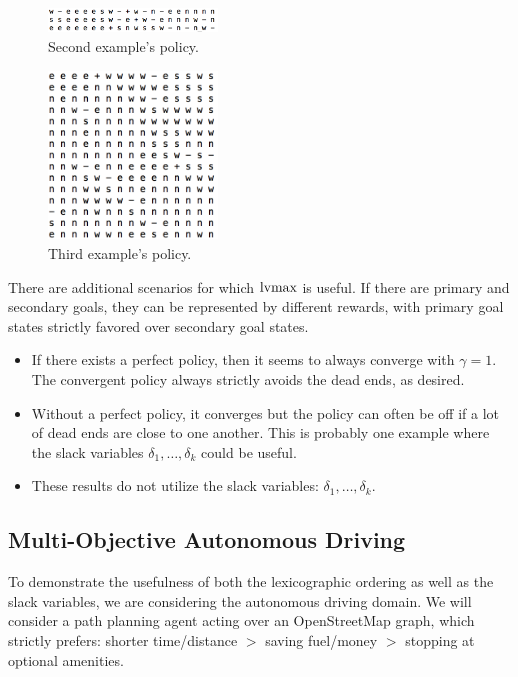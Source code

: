 \begin{figure}[h]
    \centering
    \includegraphics[width=0.4\textwidth,bb=0 0 561 81]{seed_2.png}
    \caption{Second example's policy.}
    \label{fig:seed_2}
\end{figure}

\begin{figure}[h]
    \centering
    \includegraphics[width=0.4\textwidth,bb=0 0 418 416]{seed_3.png}
    \caption{Third example's policy.}
    \label{fig:seed_3}
\end{figure}

There are additional scenarios for which $\operatorname*{lvmax}$ is useful. If there are primary and secondary goals, they can be represented by different rewards, with primary goal states strictly favored over secondary goal states.

\begin{itemize}
    \item If there exists a perfect policy, then it seems to always converge with $\gamma = 1$. The convergent policy always strictly avoids the dead ends, as desired.
    \item Without a perfect policy, it converges but the policy can often be off if a lot of dead ends are close to one another. This is probably one example where the slack variables $\delta_1, \ldots, \delta_k$ could be useful.
    \item These results do not utilize the slack variables: $\delta_1, \ldots, \delta_k$.
\end{itemize}


\subsection{Multi-Objective Autonomous Driving}

To demonstrate the usefulness of both the lexicographic ordering as well as the slack variables, we are considering the autonomous driving domain. We will consider a path planning agent acting over an OpenStreetMap graph, which strictly prefers: shorter time/distance $>$ saving fuel/money $>$ stopping at optional amenities.

